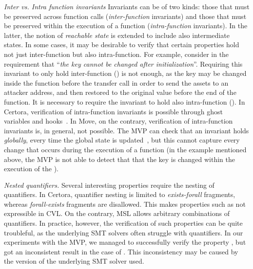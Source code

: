 \emph{Inter vs. Intra function invariants}  
Invariants can be of two kinds: those that must be preserved across function calls (\emph{inter-function} invariants) and those that must be preserved within the execution of a function (\emph{intra-function} invariants).
In the latter, the notion of \emph{reachable state} is extended to include also intermediate states. %
In some cases, it may be desirable to verify that certain properties hold not just inter-function but also intra-function. 
For example, consider in  the requirement that ``\emph{the  key cannot be changed after initialization}''.
Requiring this invariant to only hold inter-function () is not enough, as the  key may be changed inside the  function before the transfer call in order to send the assets to an attacker address, and then restored to the original value before the end of the function. 
It is necessary to require the invariant to hold also intra-function ().
In Certora, verification of intra-function invariants  is possible through ghost variables and hooks~\cite{certora-hooks}.
In Move, on the contrary, verification of intra-function invariants is, in general, not possible. The MVP can check that an invariant holds \emph{globally}, \ie every time the global state is updated~\cite{aptos-msl}, but this cannot capture every change that occurs during the execution of a function (in the example mentioned above, the MVP is not able to detect that that the  key is changed within the execution of the ).



 \emph{Nested quantifiers.} Several interesting properties require the nesting of quantifiers. 
 In Certora, quantifier nesting is limited to \emph{exists-forall} fragments, whereas \emph{forall-exists} fragments are disallowed. 
 This makes properties such as   not expressible in CVL. 
  On the contrary, MSL allows arbitrary combinations of quantifiers. 
 In practice, however, the verification of such properties can be quite troubleful, as the underlying SMT solvers often struggle with quantifiers. 
 In our experiments with the MVP, we managed to successfully verify the property , 
 but got an inconsistent result in the case of . 
This inconsistency may be caused by 
the version of the underlying SMT solver used.
 
